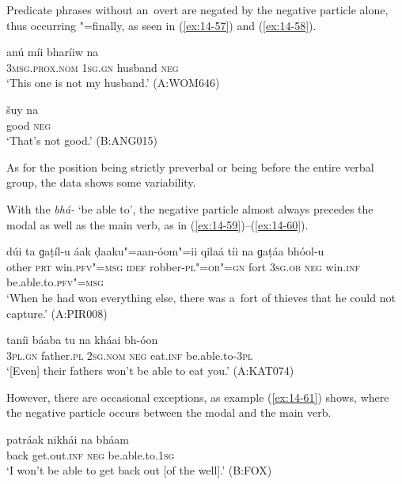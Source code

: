 Predicate  phrases without an~overt  are negated by the negative particle alone, thus occurring "=finally, as seen in (\ref{ex:14-57}) and (\ref{ex:14-58}).

\begin{exe}
\ex
\label{ex:14-57}
\gll anú míi bharíiw na \\
\textsc{3msg.prox.nom} \textsc{1sg.gn} husband \textsc{neg} \\
\glt `This one is not my husband.' (A:WOM646)

\ex
\label{ex:14-58}
\gll šuy na \\
good \textsc{neg} \\
\glt `That's not good.' (B:ANG015)
\end{exe}

As for the position being strictly preverbal or being before the entire verbal group, the data shows some variability. 


With the  \textit{bhá-} `be able to', the negative particle almost always precedes the modal as well as the main verb, as in (\ref{ex:14-59})--(\ref{ex:14-60}).

\begin{exe}
\ex
\label{ex:14-59}
\gll dúi ta ɡaṭíl-u áak ḍaaku"=aan-óom"=ii qilaá  tíi na ɡaṭáa bhóol-u \\
other \textsc{prt} win.\textsc{pfv"=msg} \textsc{idef} robber-\textsc{pl"=ob"=gn} fort  \textsc{3sg.ob} \textsc{neg} win.\textsc{inf} be.able.to.\textsc{pfv"=msg}  \\
\glt `When he had won everything else, there was a~fort of thieves that he could not capture.' (A:PIR008)

\ex
\label{ex:14-60}
\gll taníi báaba tu na kháai bh-óon \\
\textsc{3pl.gn} father.\textsc{pl} \textsc{2sg.nom} \textsc{neg} eat.\textsc{inf} be.able.to-\textsc{3pl} \\
\glt `[Even] their fathers won't be able to eat you.' (A:KAT074)
\end{exe}

However, there are occasional exceptions, as example (\ref{ex:14-61}) shows, where the negative particle occurs between the modal and the main verb.

\begin{exe}
\ex
\label{ex:14-61}
\gll patráak nikhái na bháam \\
back get.out.\textsc{inf} \textsc{neg} be.able.to.\textsc{1sg} \\
\glt `I won't be able to get back out [of the well].' (B:FOX)
\end{exe}

